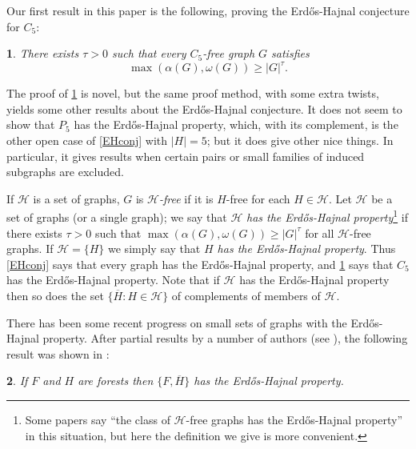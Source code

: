 \documentclass[titlepage,11pt]{article}
\newtheorem{thm}{}[section]
\begin{document}
Our first result in this paper is the following, proving the Erd\H{o}s-Hajnal conjecture for $C_5$:
\begin{thm}\label{C5thm}
There exists $\tau >0$ such that every $C_5$-free graph $G$ satisfies
$$\max(\alpha(G),\omega(G))\ge |G|^\tau .$$
\end{thm}


The proof of \ref{C5thm} is novel, but the same proof method, with some extra 
twists, yields some other results about the Erd\H{o}s-Hajnal conjecture. It does not seem to show that $P_5$ has the Erd\H os-Hajnal property,
which, with its complement, is the other open case of \ref{EHconj} with $|H|=5$; but it does give other nice things.  In particular, it gives results when certain pairs or small families of induced subgraphs are excluded.

If $\mathcal{H}$ is a set of graphs, $G$ is {\em $\mathcal{H}$-free} if it is $H$-free for each $H\in \mathcal{H}$.
Let $\mathcal{H}$ be a set of graphs (or a single graph); we say that $\mathcal{H}$ {\em has the Erd\H os-Hajnal property}\footnote{Some papers say ``the class of $\mathcal{H}$-free graphs has the Erd\H os-Hajnal property'' in this situation, but here the definition
we give is more convenient.} if there exists
$\tau>0$ such that $\max(\alpha(G),\omega(G))\ge |G|^\tau$ for all $\mathcal{H}$-free graphs.  If $\mathcal{H}=\{H\}$ we simply say that {\em $H$ has the Erd\H os-Hajnal property}.
Thus \ref{EHconj} says that every graph has the Erd\H os-Hajnal property, and \ref{C5thm} says that $C_5$ has the Erd\H os-Hajnal property. Note that if $\mathcal{H}$ has the Erd\H os-Hajnal property then so does the set $\{\overline H:H\in\mathcal H\}$ of complements of members of $\mathcal{H}$.

There has been some recent progress on small sets of graphs with the Erd\H os-Hajnal property.  After partial results by a number of authors (see \cite{lagoutte, hooks, liebenau}), 
the following result was shown in \cite{pure1}:

\begin{thm}\label{treescomp}
If $F$ and $H$ are forests then 
$\{F, \overline{H}\}$ has the Erd\H os-Hajnal property.
\end{thm}
\end{document}
